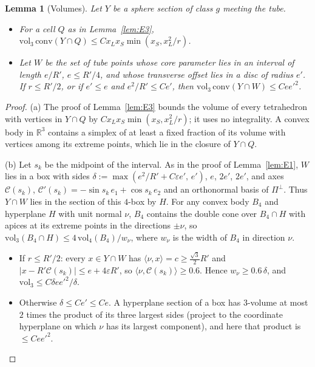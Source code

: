 \documentclass[aps,prx,twocolumn,superscriptaddress,nofootinbib,longbibliography]{revtex4-2}
\theoremstyle{plain}
\newtheorem{lemma}{Lemma}
\theoremstyle{definition}
\theoremstyle{remark}
\newcommand{\R}{\mathbb{R}}
\begin{document}
\begin{lemma}[Volumes]\label{lem:F3}
Let $Y$ be a sphere section of class $g$ meeting the tube.
\begin{itemize}\setlength\itemsep{0pt}
\item[(a)] For a cell $Q$ as in Lemma~\ref{lem:E3}, $\mathrm{vol}_3\,\mathrm{conv}(Y\cap Q)\le Cx_Lx_S\min(x_S,x_L^2/r)$.
\item[(b)] Let $W$ be the set of tube points whose core parameter lies in an interval of length $e/R'$, $e\le R'/4$, and whose transverse offset lies in a disc of radius $e'$. If $r\le R'/2$, or if $e'\le e$ and $e^2/R'\le Ce'$, then $\mathrm{vol}_3\,\mathrm{conv}(Y\cap W)\le Cee'^2$.
\end{itemize}
\end{lemma}
\begin{proof}
(a) The proof of Lemma~\ref{lem:E3} bounds the volume of every tetrahedron with vertices in $Y\cap Q$ by $Cx_Lx_S\min(x_S,x_L^2/r)$; it uses no integrality. A convex body in $\R^3$ contains a simplex of at least a fixed fraction of its volume with vertices among its extreme points, which lie in the closure of $Y\cap Q$.

(b) Let $s_k$ be the midpoint of the interval. As in the proof of Lemma~\ref{lem:E1}, $W$ lies in a box with sides $\delta:=\max(e^2/R'+C\varepsilon e',\,e')$, $e$, $2e'$, $2e'$, and axes $\mathcal C(s_k)$, $\mathcal C'(s_k)=-\sin s_k\,e_1+\cos s_k\,e_2$ and an orthonormal basis of $\Pi^\perp$. Thus $Y\cap W$ lies in the section of this $4$-box by $H$. For any convex body $B_4$ and hyperplane $H$ with unit normal $\nu$, $B_4$ contains the double cone over $B_4\cap H$ with apices at its extreme points in the directions $\pm\nu$, so $\mathrm{vol}_3(B_4\cap H)\le4\,\mathrm{vol}_4(B_4)/w_\nu$, where $w_\nu$ is the width of $B_4$ in direction $\nu$.
\begin{itemize}\setlength\itemsep{0pt}
\item If $r\le R'/2$: every $x\in Y\cap W$ has $\langle\nu,x\rangle=c\ge\tfrac{\sqrt3}2R'$ and $|x-R'\mathcal C(s_k)|\le e+4\varepsilon R'$, so $\langle\nu,\mathcal C(s_k)\rangle\ge0.6$. Hence $w_\nu\ge0.6\,\delta$, and $\mathrm{vol}_3\le C\delta ee'^2/\delta$.
\item Otherwise $\delta\le Ce'\le Ce$. A hyperplane section of a box has $3$-volume at most $2$ times the product of its three largest sides (project to the coordinate hyperplane on which $\nu$ has its largest component), and here that product is $\le Cee'^2$.
\end{itemize}
\end{proof}
\end{document}
